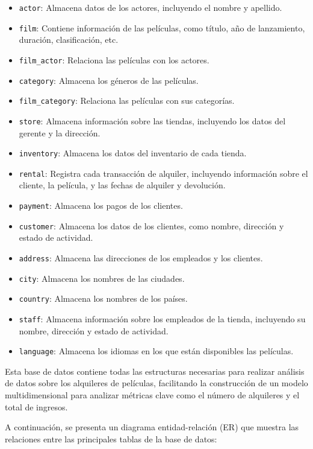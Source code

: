 \documentclass{article}
\begin{document}
\begin{itemize}
    \item \texttt{actor}: Almacena datos de los actores, incluyendo el nombre y apellido.
    \item \texttt{film}: Contiene información de las películas, como título, año de lanzamiento, duración, clasificación, etc.
    \item \texttt{film\_actor}: Relaciona las películas con los actores.
    \item \texttt{category}: Almacena los géneros de las películas.
    \item \texttt{film\_category}: Relaciona las películas con sus categorías.
    \item \texttt{store}: Almacena información sobre las tiendas, incluyendo los datos del gerente y la dirección.
    \item \texttt{inventory}: Almacena los datos del inventario de cada tienda.
    \item \texttt{rental}: Registra cada transacción de alquiler, incluyendo información sobre el cliente, la película, y las fechas de alquiler y devolución.
    \item \texttt{payment}: Almacena los pagos de los clientes.
    \item \texttt{customer}: Almacena los datos de los clientes, como nombre, dirección y estado de actividad.
    \item \texttt{address}: Almacena las direcciones de los empleados y los clientes.
    \item \texttt{city}: Almacena los nombres de las ciudades.
    \item \texttt{country}: Almacena los nombres de los países.
    \item \texttt{staff}: Almacena información sobre los empleados de la tienda, incluyendo su nombre, dirección y estado de actividad.
    \item \texttt{language}: Almacena los idiomas en los que están disponibles las películas.
\end{itemize}

Esta base de datos contiene todas las estructuras necesarias para realizar análisis de datos sobre los alquileres de películas, facilitando la construcción de un modelo multidimensional para analizar métricas clave como el número de alquileres y el total de ingresos.

\newpage
A continuación, se presenta un diagrama entidad-relación (ER) que muestra las relaciones entre las principales tablas de la base de datos:
\end{document}
